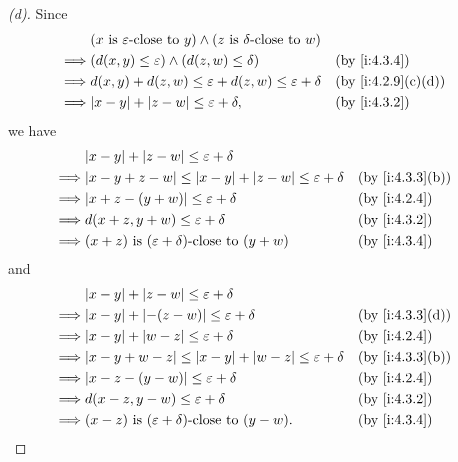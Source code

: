 \begin{proof}[(d)]
  Since
  \begin{align*}
             & (x \text{ is \(\varepsilon\)-close to } y) \land (z \text{ is \(\delta\)-close to } w)                        \\
    \implies & \pa{d(x, y) \leq \varepsilon} \land \pa{d(z, w) \leq \delta}                           &  & \by{i:4.3.4}      \\
    \implies & d(x, y) + d(z, w) \leq \varepsilon + d(z, w) \leq \varepsilon + \delta                 &  & \by{i:4.2.9}[c,d] \\
    \implies & \abs{x - y} + \abs{z - w} \leq \varepsilon + \delta,                                   &  & \by{i:4.3.2}
  \end{align*}
  we have
  \begin{align*}
             & \abs{x - y} + \abs{z - w} \leq \varepsilon + \delta                                               \\
    \implies & \abs{x - y + z - w} \leq \abs{x - y} + \abs{z - w} \leq \varepsilon + \delta &  & \by{i:4.3.3}[b] \\
    \implies & \abs{x + z - (y + w)} \leq \varepsilon + \delta                              &  & \by{i:4.2.4}    \\
    \implies & d(x + z, y + w) \leq \varepsilon + \delta                                    &  & \by{i:4.3.2}    \\
    \implies & (x + z) \text{ is \((\varepsilon + \delta)\)-close to } (y + w)              &  & \by{i:4.3.4}
  \end{align*}
  and
  \begin{align*}
             & \abs{x - y} + \abs{z - w} \leq \varepsilon + \delta                                               \\
    \implies & \abs{x - y} + \abs{-(z - w)} \leq \varepsilon + \delta                       &  & \by{i:4.3.3}[d] \\
    \implies & \abs{x - y} + \abs{w - z} \leq \varepsilon + \delta                          &  & \by{i:4.2.4}    \\
    \implies & \abs{x - y + w - z} \leq \abs{x - y} + \abs{w - z} \leq \varepsilon + \delta &  & \by{i:4.3.3}[b] \\
    \implies & \abs{x - z - (y - w)} \leq \varepsilon + \delta                              &  & \by{i:4.2.4}    \\
    \implies & d(x - z, y - w) \leq \varepsilon + \delta                                    &  & \by{i:4.3.2}    \\
    \implies & (x - z) \text{ is \((\varepsilon + \delta)\)-close to } (y - w).             &  & \by{i:4.3.4}
  \end{align*}
\end{proof}

